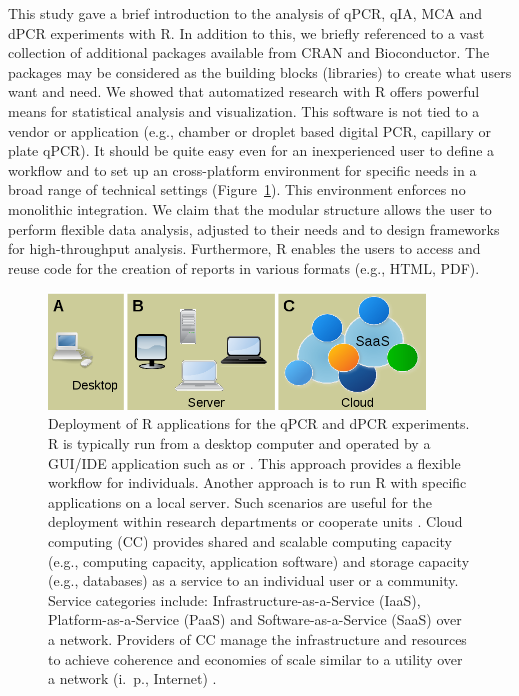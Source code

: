 This study gave a brief introduction to the analysis of qPCR, qIA, MCA and dPCR 
experiments with R. In addition to this, we briefly referenced to a vast 
collection of additional packages available from CRAN and Bioconductor. The 
packages may be considered as the building blocks (libraries) to create what 
users want and need. We showed that automatized research with R offers powerful 
means for statistical analysis and visualization. This software is not tied to a 
vendor or application (e.g., chamber or droplet based digital PCR, 
capillary or plate qPCR). It should be quite easy even for an inexperienced user 
to define a workflow and to set up an cross-platform environment for specific needs in a broad 
range of technical settings (Figure~\ref{figure:options}). This environment enforces no 
monolithic integration. We claim that the modular structure allows 
the user to perform flexible data analysis, adjusted to their needs and to 
design frameworks for high-throughput analysis. Furthermore, R enables the users 
to access and reuse code for the creation of reports in various formats (e.g., 
HTML, PDF).

\begin{figure}[htbp]
  \centering
  \includegraphics[clip=true, trim=0.05cm 0cm 0.06cm 0.05cm, width=10cm]{figures/options.png}
  \caption{Deployment of R applications for the qPCR and dPCR experiments. 
 R is typically run from a desktop computer and operated by a 
GUI/IDE application such as  or . This approach 
provides a flexible workflow for individuals.  Another approach is 
to run R with specific applications on a local server. Such scenarios are 
useful 
for the deployment within research departments or cooperate units 
\citep{R_web}. 
 Cloud computing (CC) provides shared and scalable computing 
capacity (e.g., computing capacity, application software) and storage capacity 
(e.g., databases) as a service to an individual user or a community. Service 
categories include: Infrastructure-as-a-Service (IaaS), Platform-as-a-Service 
(PaaS) and Software-as-a-Service (SaaS) over a network. Providers of CC manage 
the infrastructure and resources to achieve coherence and economies of scale 
similar to a utility over a network (i.~p., Internet) \citep{R_cloud}.}
  \label{figure:options}
\end{figure} 


